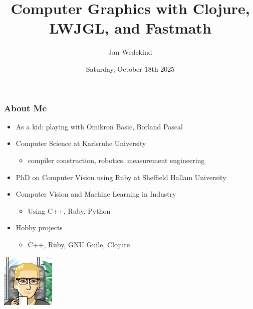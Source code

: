 \documentclass[aspectratio=169,11pt,xcolor=dvipsnames]{beamer}
\title{Computer Graphics with Clojure, LWJGL, and Fastmath}
\author{Jan Wedekind}
\date{Saturday, October 18th 2025}
\begin{document}
\begin{frame}
  \titlepage{}
\end{frame}

\begin{frame}
  \frametitle{About Me}
  \begin{minipage}[b]{0.79\textwidth}
    \begin{itemize}
      \item As a kid: playing with Omikron Basic, Borland Pascal
      \item Computer Science at Karlsruhe University
        \begin{itemize}
          \item compiler construction, robotics, measurement engineering
        \end{itemize}
      \item PhD on Computer Vision using Ruby at Sheffield Hallam University
      \item Computer Vision and Machine Learning in Industry
        \begin{itemize}
          \item Using C++, Ruby, Python
        \end{itemize}
      \item Hobby projects
        \begin{itemize}
          \item C++, Ruby, GNU Guile, Clojure
        \end{itemize}
    \end{itemize}
  \end{minipage}
  \begin{minipage}[b]{0.2\textwidth}
    \includegraphics[width=\textwidth]{avatar}\\

\end{minipage}
\end{frame}
\end{document}
